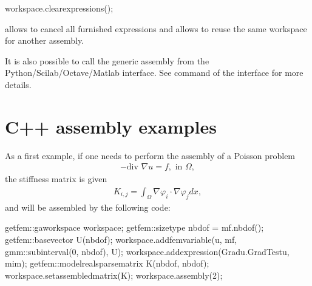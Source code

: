 \documentclass[a4paper,11pt,english]{sphinxmanual}
\begin{document}
\begin{sphinxVerbatim}[commandchars=\\\{\}]
workspace.clear\PYGZus{}expressions();
\end{sphinxVerbatim}

allows to cancel all furnished expressions and allows to re\sphinxhyphen{}use the same workspace for another assembly.

It is also possible to call the generic assembly from the Python/Scilab/Octave/Matlab interface. See  command of the interface for more details.


\section{C++ assembly examples}
\label{\detokenize{userdoc/gasm_high:c-assembly-examples}}
As a first example, if one needs to perform the assembly of a Poisson problem
\begin{equation*}
\begin{split}-\mbox{div } \nabla u = f, \mbox{ in } \Omega,\end{split}
\end{equation*}
the stiffness matrix is given
\begin{equation*}
\begin{split}K_{i,j} = \int_{\Omega} \nabla \varphi_i \cdot \nabla \varphi_j dx,\end{split}
\end{equation*}
and will be assembled by the following code:

\begin{sphinxVerbatim}[commandchars=\\\{\}]
getfem::ga\PYGZus{}workspace workspace;
getfem::size\PYGZus{}type nbdof = mf.nb\PYGZus{}dof();
getfem::base\PYGZus{}vector U(nbdof);
workspace.add\PYGZus{}fem\PYGZus{}variable(\PYGZdq{}u\PYGZdq{}, mf, gmm::sub\PYGZus{}interval(0, nbdof), U);
workspace.add\PYGZus{}expression(\PYGZdq{}Grad\PYGZus{}u.Grad\PYGZus{}Test\PYGZus{}u\PYGZdq{}, mim);
getfem::model\PYGZus{}real\PYGZus{}sparse\PYGZus{}matrix K(nbdof, nbdof);
workspace.set\PYGZus{}assembled\PYGZus{}matrix(K);
workspace.assembly(2);
\end{sphinxVerbatim}
\end{document}
